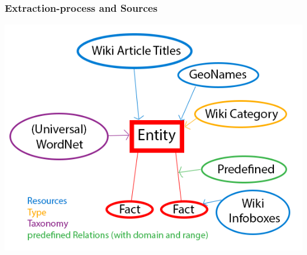 \begin{frame}
\frametitle{Extraction-process and Sources}
\includegraphics[scale=0.35]{img/yago-ex1.png}
\end{frame}

